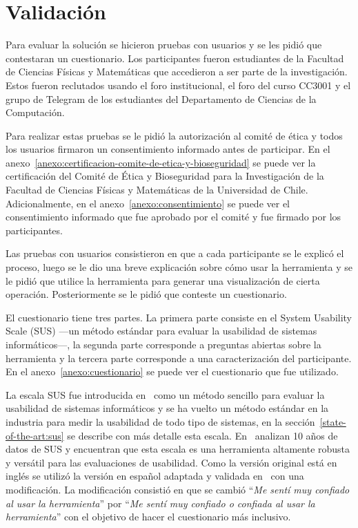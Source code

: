 \chapter{Validación}

Para evaluar la solución se hicieron pruebas con usuarios y se les pidió que contestaran un cuestionario. Los participantes fueron estudiantes de la Facultad de Ciencias Físicas y Matemáticas que accedieron a ser parte de la investigación. Estos fueron reclutados usando el foro institucional, el foro del curso CC3001 y el grupo de Telegram de los estudiantes del Departamento de Ciencias de la Computación.

Para realizar estas pruebas se le pidió la autorización al comité de ética y todos los usuarios firmaron un consentimiento informado antes de participar. En el anexo~\ref{anexo:certificacion-comite-de-etica-y-bioseguridad} se puede ver la certificación del Comité de Ética y Bioseguridad para la Investigación de la Facultad de Ciencias Físicas y Matemáticas de la Universidad de Chile. Adicionalmente, en el anexo~\ref{anexo:consentimiento} se puede ver el consentimiento informado que fue aprobado por el comité y fue firmado por los participantes.

Las pruebas con usuarios consistieron en que a cada participante se le explicó el proceso, luego se le dio una breve explicación sobre cómo usar la herramienta y se le pidió que utilice la herramienta para generar una visualización de cierta operación. Posteriormente se le pidió que conteste un cuestionario.

El cuestionario tiene tres partes. La primera parte consiste en el System Usability Scale (SUS) ---un método estándar para evaluar la usabilidad de sistemas informáticos---, la segunda parte corresponde a preguntas abiertas sobre la herramienta y la tercera parte corresponde a una caracterización del participante. En el anexo~\ref{anexo:cuestionario} se puede ver el cuestionario que fue utilizado.

La escala SUS fue introducida en~\cite{brooke1996quick} como un método sencillo para evaluar la usabilidad de sistemas informáticos y se ha vuelto un método estándar en la industria para medir la usabilidad de todo tipo de sistemas, en la sección~\ref{state-of-the-art:sus} se describe con más detalle esta escala. En~\cite{evaluation-of-sus} analizan 10 años de datos de SUS y encuentran que esta escala es una herramienta altamente robusta y versátil para las evaluaciones de usabilidad. Como la versión original está en inglés se utilizó la versión en español adaptada y validada en~\cite{spanish-sus} con una modificación. La modificación consistió en que se cambió ``\textit{Me sentí muy confiado al usar la herramienta}'' por ``\textit{Me sentí muy confiado o confiada al usar la herramienta}'' con el objetivo de hacer el cuestionario más inclusivo.

